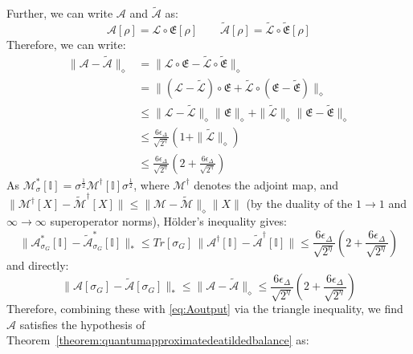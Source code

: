 \documentclass[aps,floatfix,10pt,amssymb,amsfont,amsmath,superscriptaddress,float,nofootinbib,longbibliography,nobalancelastpage,twocolumn]{revtex4-2}
\begin{document}
\begin{widetext}
\begin{equation}
\end{equation}
Further, we can write $\mathcal{A}$ and $\tilde{\mathcal{A}}$ as:
\begin{equation}
    \mathcal{A}[\rho] = \mathcal{L} \circ \mathfrak{E} [\rho] \qquad  \tilde{\mathcal{A}}[\rho] = \tilde{\mathcal{L}} \circ \tilde{\mathfrak{E}} [\rho]
\end{equation}
Therefore, we can write:
\begin{align}
    \|\mathcal{A} - \tilde{\mathcal{A}}\|_{\diamond} &= \|\mathcal{L} \circ \mathfrak{E} - \tilde{\mathcal{L}} \circ \tilde{\mathfrak{E}}\|_{\diamond}\\
    &=\|(\mathcal{L}-\tilde{\mathcal{L}}) \circ \mathfrak{E} + \tilde{\mathcal{L}} \circ (\mathfrak{E}-\tilde{\mathfrak{E}})\|_{\diamond}\\
    &\leq\|\mathcal{L}-\tilde{\mathcal{L}}\|_{\diamond} \|\mathfrak{E} \|_{\diamond}+ \|\tilde{\mathcal{L}}\|_{\diamond} \|\mathfrak{E}-\tilde{\mathfrak{E}}\|_{\diamond}\\
    &\leq \frac{6\epsilon_{\Delta}}{\sqrt{2^{\eta}}}(1+\|\tilde{\mathcal{L}}\|_{\diamond})\\
    &\leq \frac{6\epsilon_{\Delta}}{\sqrt{2^{\eta}}}(2+\frac{6\epsilon_{\Delta}}{\sqrt{2^{\eta}}})
\end{align}
As $\mathcal{M}^*_{\sigma}[\mathbb{I}] = \sigma^{\frac{1}{2}}\mathcal{M}^{\dagger}[\mathbb{I}]\sigma^{\frac{1}{2}}$, where $\mathcal{M}^{\dagger}$ denotes the adjoint map, and $\|\mathcal{M}^{\dagger}[X] - \tilde{\mathcal{M}}^{\dagger}[X]\| \leq \|\mathcal{M}-\tilde{\mathcal{M}}\|_{\diamond}\|X\|$ (by the duality of the $1\to1$ and $\infty\to\infty$ superoperator norms), H\"older's inequality gives:
\begin{equation}
    \|\mathcal{A}^*_{\sigma_G}[\mathbb{I}] - \tilde{\mathcal{A}}^*_{\sigma_G}[\mathbb{I}]\|_* \leq Tr[\sigma_G]\,\|\mathcal{A}^{\dagger}[\mathbb{I}] - \tilde{\mathcal{A}}^{\dagger}[\mathbb{I}]\| \leq \frac{6\epsilon_{\Delta}}{\sqrt{2^{\eta}}}(2+\frac{6\epsilon_{\Delta}}{\sqrt{2^{\eta}}})
\end{equation}
and directly:
\begin{equation}
    \|\mathcal{A}[\sigma_G] - \tilde{\mathcal{A}}[\sigma_G]\|_* \leq \|\mathcal{A}-\tilde{\mathcal{A}}\|_{\diamond} \leq \frac{6\epsilon_{\Delta}}{\sqrt{2^{\eta}}}(2+\frac{6\epsilon_{\Delta}}{\sqrt{2^{\eta}}})
\end{equation}
Therefore, combining these with \eqref{eq:Aoutput} via the triangle inequality, we find $\mathcal{A}$ satisfies the hypothesis of Theorem~\ref{theorem:quantumapproximatedeatildedbalance} as:

\end{widetext}
\end{document}
